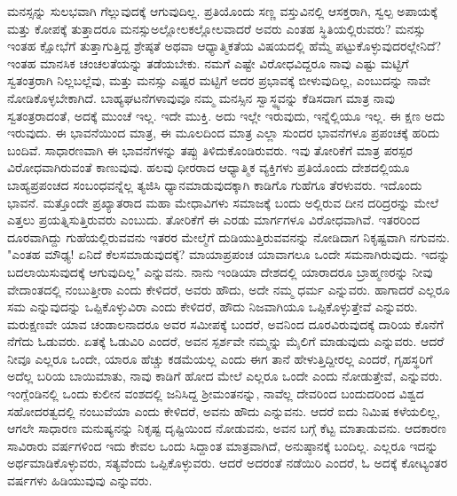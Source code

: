 ಮನಸ್ಸನ್ನು ಸುಲಭವಾಗಿ ಗೆಲ್ಲುವುದಕ್ಕೆ ಆಗುವುದಿಲ್ಲ. ಪ್ರತಿಯೊಂದು ಸಣ್ಣ ವಸ್ತುವಿನಲ್ಲಿ ಆಸಕ್ತರಾಗಿ, ಸ್ವಲ್ಪ ಅಪಾಯಕ್ಕೆ ಮತ್ತು ಕೋಪಕ್ಕೆ ತುತ್ತಾದರೂ ಮನಸ್ಸು\break ಅಲ್ಲೋಲಕಲ್ಲೋಲವಾದರೆ ಅವರು ಎಂತಹ ಸ್ಥಿತಿಯಲ್ಲಿರುವರು? ಮನಸ್ಸು ಇಂತಹ ಕ್ಷೋಭೆಗೆ ತುತ್ತಾಗುತ್ತಿದ್ದ ಶ್ರೇಷ್ಠತೆ ಅಥವಾ ಆಧ್ಯಾತ್ಮಿಕತೆಯ ವಿಷಯದಲ್ಲಿ ಹೆಮ್ಮೆ ಪಟ್ಟುಕೊಳ್ಳುವುದರಲ್ಲೇನಿದೆ? ಇಂತಹ ಮಾನಸಿಕ ಚಂಚಲತೆಯನ್ನು ತಡೆಯಬೇಕು. ನಮಗೆ ಎಷ್ಟೇ ವಿರೋಧವಿದ್ದರೂ ನಾವು ಎಷ್ಟು ಮಟ್ಟಿಗೆ ಸ್ವತಂತ್ರರಾಗಿ ನಿಲ್ಲಬಲ್ಲೆವು, ಮತ್ತು ಮನಸ್ಸು ಎಷ್ಟರ ಮಟ್ಟಿಗೆ ಅದರ ಪ್ರಭಾವಕ್ಕೆ ಬೀಳುವುದಿಲ್ಲ, ಎಂಬುದನ್ನು ನಾವೇ ನೋಡಿಕೊಳ್ಳಬೇಕಾಗಿದೆ. ಬಾಹ್ಯಘಟನೆಗಳಾವುವೂ ನಮ್ಮ ಮನಸ್ಸಿನ ಸ್ವಾಸ್ಥ್ಯವನ್ನು ಕೆಡಿಸದಾಗ ಮಾತ್ರ ನಾವು ಸ್ವತಂತ್ರರಾದಂತೆ, ಅದಕ್ಕೆ ಮುಂಚೆ ಇಲ್ಲ. ಇದೇ ಮುಕ್ತಿ. ಅದು ಇಲ್ಲೇ ಇರುವುದು, ಇನ್ನೆಲ್ಲಿಯೂ ಇಲ್ಲ. ಈ ಕ್ಷಣ ಅದು ಇರುವುದು. ಈ ಭಾವನೆಯಿಂದ ಮಾತ್ರ, ಈ ಮೂಲದಿಂದ ಮಾತ್ರ ಎಲ್ಲಾ ಸುಂದರ ಭಾವನೆಗಳೂ ಪ್ರಪಂಚಕ್ಕೆ ಹರಿದು ಬಂದಿವೆ. ಸಾಧಾರಣವಾಗಿ ಈ ಭಾವನೆಗಳನ್ನು ತಪ್ಪು ತಿಳಿದುಕೊಂಡಿರುವರು. ಇವು ತೋರಿಕೆಗೆ ಮಾತ್ರ ಪರಸ್ಪರ ವಿರೋಧವಾಗಿರುವಂತೆ ಕಾಣುವುವು. ಹಲವು ಧೀರರಾದ ಆಧ್ಯಾತ್ಮಿಕ ವ್ಯಕ್ತಿಗಳು ಪ್ರತಿಯೊಂದು ದೇಶದಲ್ಲಿಯೂ ಬಾಹ್ಯಪ್ರಪಂಚದ ಸಂಬಂಧವನ್ನೆಲ್ಲ ತ್ಯಜಿಸಿ ಧ್ಯಾನಮಾಡುವುದಕ್ಕಾಗಿ ಕಾಡಿಗೊ ಗುಹೆಗೂ ತೆರಳುವರು. ಇದೊಂದು ಭಾವನೆ. ಮತ್ತೊಂದೇ ಪ್ರಖ್ಯಾತರಾದ ಮಹಾ ಮೇಧಾವಿಗಳು ಸಮಾಜಕ್ಕೆ ಬಂದು ಅಲ್ಲಿರುವ ದೀನ ದರಿದ್ರರನ್ನು ಮೇಲೆ ಎತ್ತಲು ಪ್ರಯತ್ನಿಸುತ್ತಿರುವರು ಎಂಬುದು. ತೋರಿಕೆಗೆ ಈ ಎರಡು ಮಾರ್ಗಗಳೂ ವಿರೋಧವಾಗಿವೆ. ಇತರರಿಂದ ದೂರವಾಗಿದ್ದು ಗುಹೆಯಲ್ಲಿರುವವನು ಇತರರ ಮೇಲ್ಮೆಗೆ ದುಡಿಯುತ್ತಿರುವವನನ್ನು ನೋಡಿದಾಗ ನಿಕೃಷ್ಟವಾಗಿ ನಗುವನು. "ಎಂತಹ ಮೌಢ್ಯ! ಏನಿದೆ ಕೆಲಸಮಾಡುವುದಕ್ಕೆ? ಮಾಯಾಪ್ರಪಂಚ ಯಾವಾಗಲೂ ಒಂದೇ ಸಮನಾಗಿರುವುದು. ಇದನ್ನು ಬದಲಾಯಿಸುವುದಕ್ಕೆ ಆಗುವುದಿಲ್ಲ" ಎನ್ನುವನು. ನಾನು ಇಂಡಿಯಾ ದೇಶದಲ್ಲಿ ಯಾರಾದರೂ ಬ್ರಾಹ್ಮಣರನ್ನು ನೀವು ವೇದಾಂತದಲ್ಲಿ ನಂಬುತ್ತೀರಾ ಎಂದು ಕೇಳಿದರೆ, ಅವರು ಹೌದು, ಅದೇ ನಮ್ಮ ಧರ್ಮ ಎನ್ನುವರು. ಹಾಗಾದರೆ ಎಲ್ಲರೂ ಸಮ ಎನ್ನುವುದನ್ನು ಒಪ್ಪಿಕೊಳ್ಳುವಿರಾ ಎಂದು ಕೇಳಿದರೆ, ಹೌದು ನಿಜವಾಗಿಯೂ ಒಪ್ಪಿಕೊಳ್ಳುತ್ತೇವೆ ಎನ್ನುವರು. ಮರುಕ್ಷಣವೇ ಯಾವ ಚಂಡಾಲನಾದರೂ ಅವರ ಸಮೀಪಕ್ಕೆ ಬಂದರೆ, ಅವನಿಂದ ದೂರವಿರುವುದಕ್ಕೆ ದಾರಿಯ ಕೊನೆಗೆ ನೆಗೆದು ಓಡುವರು. ಏತಕ್ಕೆ ಓಡುವಿರಿ ಎಂದರೆ, ಅವನ ಸ್ಪರ್ಶವೇ ನಮ್ಮನ್ನು ಮೈಲಿಗೆ ಮಾಡುವುದು ಎನ್ನುವರು. ಆದರೆ ನೀವೂ ಎಲ್ಲರೂ ಒಂದೇ, ಯಾರೂ ಹೆಚ್ಚು ಕಡಮೆಯಲ್ಲ ಎಂದು ಈಗ ತಾನೆ ಹೇಳುತ್ತಿದ್ದೀರಲ್ಲ ಎಂದರೆ, ಗೃಹಸ್ಥರಿಗೆ ಅದೆಲ್ಲ ಬರಿಯ ಬಾಯಿಮಾತು, ನಾವು ಕಾಡಿಗೆ ಹೋದ ಮೇಲೆ ಎಲ್ಲರೂ ಒಂದೇ ಎಂದು ನೋಡುತ್ತೇವೆ, ಎನ್ನುವರು. ಇಂಗ್ಲೆಂಡಿನಲ್ಲಿ ಒಂದು ಕುಲೀನ ವಂಶದಲ್ಲಿ ಜನಿಸಿದ್ದ ಶ‍್ರೀಮಂತನನ್ನು, ನಾವೆಲ್ಲ ದೇವರಿಂದ ಬಂದುದರಿಂದ ವಿಶ್ವದ ಸಹೋದರತ್ವದಲ್ಲಿ ನಂಬುವೆಯಾ ಎಂದು ಕೇಳಿದರೆ, ಅವನು ಹೌದು ಎನ್ನುವನು. ಆದರೆ ಐದು ನಿಮಿಷ ಕಳೆಯಲಿಲ್ಲ, ಆಗಲೇ ಸಾಧಾರಣ ಮನುಷ್ಯನನ್ನು ನಿಕೃಷ್ಟ ದೃಷ್ಟಿಯಿಂದ ನೋಡುವನು, ಅವನ ಬಗ್ಗೆ ಕೆಟ್ಟ ಮಾತಾಡುವನು. ಆದಕಾರಣ ಸಾವಿರಾರು ವರ್ಷಗಳಿಂದ ಇದು ಕೇವಲ ಒಂದು ಸಿದ್ದಾಂತ ಮಾತ್ರವಾಗಿದೆ, ಅನುಷ್ಠಾನಕ್ಕೆ ಬಂದಿಲ್ಲ. ಎಲ್ಲರೂ ಇದನ್ನು ಅರ್ಥಮಾಡಿಕೊಳ್ಳುವರು, ಸತ್ಯವೆಂದು ಒಪ್ಪಿಕೊಳ್ಳುವರು. ಆದರೆ ಅದರಂತೆ ನಡೆಯಿರಿ ಎಂದರೆ, ಓ ಅದಕ್ಕೆ ಕೋಟ್ಯಂತರ ವರ್ಷಗಳು ಹಿಡಿಯುವುವು ಎನ್ನುವರು.

